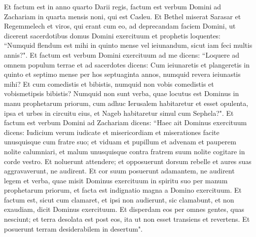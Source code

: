 \begin{biblechapter}  
\verse Et factum est in anno quarto Darii regis, factum est verbum Domini ad Zachariam in quarta mensis noni, qui est Casleu. 
\verse Et Bethel miserat Sarasar et Regemmelech et viros, qui erant cum eo, ad deprecandam faciem Domini, 
\verse ut dicerent sacerdotibus domus Domini exercituum et prophetis loquentes: “Numquid flendum est mihi in quinto mense vel ieiunandum, sicut iam feci multis annis?". 
\verse Et factum est verbum Domini exercituum ad me dicens: 
\verse “Loquere ad omnem populum terrae et ad sacerdotes dicens: Cum ieiunaretis et plangeretis in quinto et septimo mense per hos septuaginta annos, numquid revera ieiunastis mihi?  
\verse Et cum comedistis et bibistis, numquid non vobis comedistis et vobismetipsis bibistis? 
\verse Numquid non sunt verba, quae locutus est Dominus in manu prophetarum priorum, cum adhuc Ierusalem habitaretur et esset opulenta, ipsa et urbes in circuitu eius, et Nageb habitaretur simul cum Sephela?". 
\verse Et factum est verbum Domini ad Zachariam dicens: 
\verse “Haec ait Dominus exercituum dicens: Iudicium verum iudicate et misericordiam et miserationes facite unusquisque cum fratre suo; 
\verse et viduam et pupillum et advenam et pauperem nolite calumniari, et malum unusquisque contra fratrem suum nolite cogitare in corde vestro. 
\verse Et noluerunt attendere; et opposuerunt dorsum rebelle et aures suas aggravaverunt, ne audirent. 
\verse Et cor suum posuerunt adamantem, ne audirent legem et verba, quae misit Dominus exercituum in spiritu suo per manum prophetarum priorum, et facta est indignatio magna a Domino exercituum. 
\verse Et factum est, sicut cum clamaret, et ipsi non audierunt, sic clamabunt, et non exaudiam, dicit Dominus exercituum. 
\verse Et disperdam eos per omnes gentes, quas nesciunt; et terra desolata est post eos, ita ut non esset transiens et revertens. Et posuerunt terram desiderabilem in desertum". 
\end{biblechapter}


